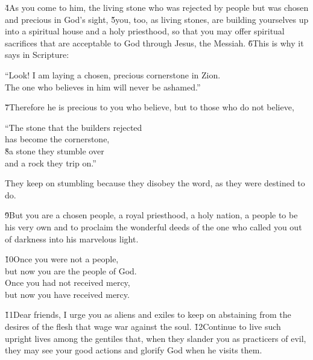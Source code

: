 \v{4}As you come to him, the living stone who was rejected by people but was chosen and precious in God's sight, \v{5}you, too, as living stones, are building yourselves up into a spiritual house and a holy priesthood, so that you may offer spiritual sacrifices that are acceptable to God through Jesus, the Messiah. \v{6}This is why it says in Scripture:

\begin{poetry}
\poeml ``Look! I am laying a chosen, precious cornerstone in Zion. \\
\poemll    The one who believes in him will never be ashamed.''
\end{poetry}

\v{7}Therefore he is precious to you who believe, but to those who do not believe,

\begin{poetry}
\poeml ``The stone that the builders rejected \\
\poemll    has become the cornerstone, \\
\poeml \v{8}a stone they stumble over \\
\poemll    and a rock they trip on.''
\end{poetry}

They keep on stumbling because they disobey the word, as they were destined to do.

\v{9}But you are a chosen people, a royal priesthood, a holy nation, a people to be his very own and to proclaim the wonderful deeds of the one who called you out of darkness into his marvelous light.

\begin{poetry}
\poeml \v{10}Once you were not a people, \\
\poemll    but now you are the people of God. \\
\poeml Once you had not received mercy, \\
\poemll    but now you have received mercy.
\end{poetry}

\v{11}Dear friends, I urge you as aliens and exiles to keep on abstaining from the desires of the flesh that wage war against the soul. \v{12}Continue to live such upright lives among the gentiles that, when they slander you as practicers of evil, they may see your good actions and glorify God when he visits them.

